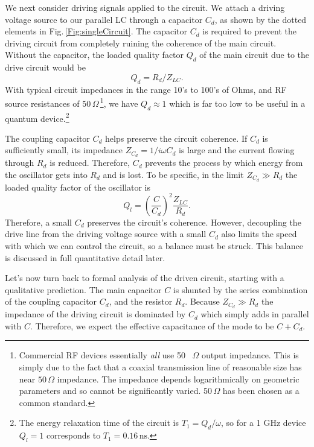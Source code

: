  \label{sec:driving}


We next consider driving signals applied to the circuit.
We attach a driving voltage source to our parallel LC through a capacitor $C_d$, as shown by the dotted elements in Fig.\,\ref{Fig:singleCircuit}.
The capacitor $C_d$ is required to prevent the driving circuit from completely ruining the coherence of the main circuit.
Without the capacitor, the loaded quality factor $Q_d$ of the main circuit due to the drive circuit would be 
\begin{equation}
Q_d = R_d / Z_{LC} .
\end{equation}
With typical circuit impedances in the range 10's to 100's of Ohms, and RF source resistances of $50\,\Omega$\,\footnote{Commercial RF devices essentially \emph{all} use 50 \, $\Omega$ output impedance. This is simply due to the fact that a coaxial transmission line of reasonable size has near $50 \, \Omega$ impedance. The impedance depends logarithmically on geometric parameters and so cannot be significantly varied. 50$ \, \Omega$ has been chosen as a common standard.}, we have $Q_d \approx 1$ which is far too low to be useful in a quantum device.\footnote{The energy relaxation time of the circuit is $T_1 = Q_d / \omega$, so for a 1 GHz device $Q_l=1$ corresponds to $T_1=0.16 \, \text{ns}$.}

The coupling capacitor $C_d$ helps preserve the circuit coherence.
If $C_d$ is sufficiently small, its impedance $Z_{C_d} = 1/i\omega C_d$ is large and the current flowing through $R_d$ is reduced.
Therefore, $C_d$ prevents the process by which energy from the oscillator gets into $R_d$ and is lost.
To be specific, in the limit $Z_{C_d} \gg R_d$ the loaded quality factor of the oscillator is 
\begin{equation}
Q_l = \left( \frac{C}{C_d} \right)^2 \frac{Z_{LC}}{R_d} .
\end{equation}
Therefore, a small $C_d$ preserves the circuit's coherence.
However, decoupling the drive line from the driving voltage source with a small $C_d$ also limits the speed with which we can control the circuit, so a balance must be struck.
This balance is discussed in full quantitative detail later.

Let's now turn back to formal analysis of the driven circuit, starting with a qualitative prediction.
The main capacitor $C$ is shunted by the series combination of the coupling capacitor $C_d$, and the resistor $R_d$.
Because  $Z_{C_d} \gg R_d$ the impedance of the driving circuit is dominated by $C_d$ which simply adds in parallel with $C$.
Therefore, we expect the effective capacitance of the mode to be $C+C_d$.


